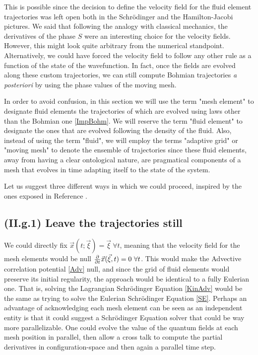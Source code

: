 \documentclass[11pt, a4paper]{article} %
\begin{document}
This is possible since the decision to define the velocity field for the fluid element trajectories was left open both in the Schrödinger and the Hamilton-Jacobi pictures. We said that following the analogy with classical mechanics, the derivatives of the phase $S$ were an interesting choice for the velocity fields. However, this might look quite arbitrary from the numerical standpoint. Alternatively, we could have forced the velocity field to follow any other rule as a function of the state of the wavefunction. In fact, once the fields are evolved along these custom trajectories, we can still compute Bohmian trajectories {\em a posteriori} by using the phase values of the moving mesh.

In order to avoid confusion, in this section we will use the term "mesh element" to designate fluid elements the trajectories of which are evolved using laws other than the Bohmian one \eqref{ImpBohm}. We will reserve the term "fluid element" to designate the ones that are evolved following the density of the fluid. Also, instead of using the term "fluid", we will employ the terms "adaptive grid" or "moving mesh" to denote the ensemble of trajectories since these fluid elements, away from having a clear ontological nature, are pragmatical components of a mesh that evolves in time adapting itself to the state of the system.

Let us suggest three different ways in which we could proceed, inspired by the ones exposed in Reference \cite{Wyatt}.\vspace{-0.25cm}

\subsection*{\bf (II.g.1) Leave the trajectories still}\vspace{-0.2cm}
 We could directly fix $\vec{x}(t;\vec{\xi})=\vec{\xi}\ \forall t$, meaning that the velocity field for the mesh elements would be null $\pdv{}{t}\vec{x}(\vec{\xi},t)=0\ \forall t$. This would make the Advective correlation potential \eqref{Adv} null, and since the grid of fluid elements would preserve its initial regularity, the approach would be identical to a fully Eulerian one. That is, solving the Lagrangian Schrödinger Equation \eqref{KinAdv} would be the same as trying to solve the Eulerian Schrödinger Equation \eqref{SE}. Perhaps an advantage of acknowledging each mesh element can be seen as an independent entity is that it could suggest a Schrödinger Equation solver that could be way more parallelizable. One could evolve the value of the quantum fields at each mesh position in parallel, then allow a cross talk to compute the partial derivatives in configuration-space and then again a parallel time step.\vspace{-0.2cm}
\end{document}
